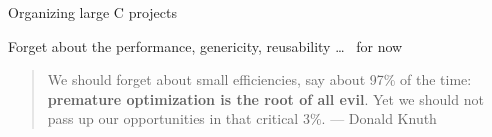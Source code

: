 \begin{frame}[fragile]{Organizing large C projects}
  \begin{block}{Forget about the performance, genericity, reusability \ldots~
      for now}
    
  \end{block}\vspace{-\baselineskip}
  \begin{quote}{}
    We should forget about small efficiencies, say about 97\% of the time:
    {\bf premature optimization is the root of all evil}. Yet we should not pass up
    our opportunities in that critical 3\%. \hfill{\rm --- Donald Knuth}
  \end{quote}
\end{frame}
